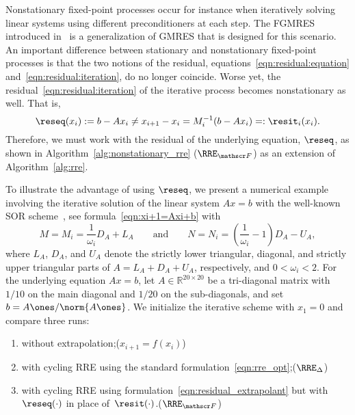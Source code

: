 Nonstationary fixed-point processes occur for instance when iteratively solving linear systems using different preconditioners at each step.
The \ac{FGMRES} introduced in~\cite{saad1993flexible} is a generalization of \ac{GMRES} that is designed for this scenario.
An important difference between stationary and nonstationary fixed-point processes is that the two notions of the residual, equations~\eqref{eqn:residual:equation} and~\eqref{eqn:residual:iteration}, do no longer coincide.
Worse yet, the residual~\eqref{eqn:residual:iteration} of the iterative process becomes nonstationary as well.
That is,
\begin{equation}
	\reseq(x_i)
	:= b - Ax_i
	\neq x_{i+1} - x_i
	= M_i^{-1} (b - Ax_i)
	=: \resit_i(x_i)
	.
\end{equation}
Therefore, we must work with the residual of the underlying equation, \(\reseq\),
as shown in Algorithm~\ref{alg:nonstationary_rre} ($\RRE_{\mathscr F}$) as an extension of Algorithm~\ref{alg:rre}.

To illustrate the advantage of using \(\reseq\),
we present a numerical example involving the iterative solution of the linear system $Ax = b$ with the well-known \ac{SOR} scheme~\cite[Section~11.2.7]{golub2013matrix},
see formula~\eqref{eqn:xi+1=Axi+b} with
\begin{equation}
	M = M_i = \frac{1}{\omega_i} D_A + L_A
	\qquad\text{and}\qquad
	N = N_i = \left( \frac{1}{\omega_i} - 1 \right) D_A - U_A,
	\label{eqn:fp_example}
\end{equation}
where $L_A$, $D_A$, and $U_A$ denote the strictly lower triangular, diagonal,
and strictly upper triangular parts of $A = L_A + D_A + U_A$, respectively,
and $0 < \omega_i < 2$.
For the underlying equation \(Ax=b\),
let $A \in \mathbb{R}^{20 \times 20}$ be a tri-diagonal matrix
with $1/10$ on the main diagonal and $1/20$ on the sub-diagonals,
and set $b = A\ones / \norm{A\ones}$.
We initialize the iterative scheme with $x_1 = 0$ and compare three runs:
\begin{enumerate}
	\item without extrapolation;\hfill($x_{i+1}=f(x_i)$)
	\item with cycling \ac{RRE} using the standard formulation~\eqref{eqn:rre_opt};\hfill($\RRE_\Delta$)
	\item\label{run:3} with cycling \ac{RRE} using formulation~\eqref{eqn:residual_extrapolant} but with~$\reseq(\cdot)$ in place of~$\resit(\cdot)$.\hfill($\RRE_{\mathscr F}$)
\end{enumerate}


